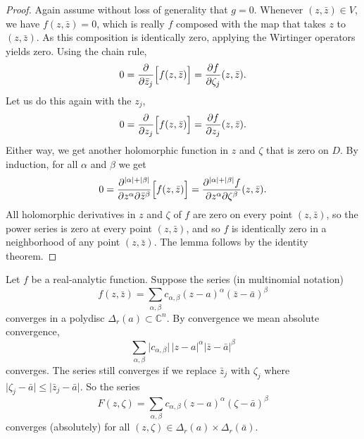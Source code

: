 \documentclass[12pt,openany]{book}
\newcommand{\sabs}[1]{\lvert {#1} \rvert}
\newcommand{\C}{{\mathbb{C}}}
\theoremstyle{plain}
\theoremstyle{remark}
\theoremstyle{definition}
\theoremstyle{exercise}
\theoremstyle{example}
\begin{document}
\begin{proof}
Again assume without loss of generality that $g=0$.
Whenever $(z,\bar{z}) \in V$, we have $f(z,\bar{z}) = 0$, which is really
$f$ composed with the map that takes $z$ to $(z,\bar{z})$.  As this
composition is identically zero, applying the Wirtinger operators yields zero.
Using the chain rule,
\begin{equation*}
0 =
\frac{\partial}{\partial \bar{z}_j} \Bigl[f(z,\bar{z})\Bigr]
=
\frac{\partial f}{\partial \zeta_j}(z,\bar{z}) .
\end{equation*}
Let us do this again with the $z_j$,
\begin{equation*}
0 =
\frac{\partial}{\partial z_j} \Bigl[f(z,\bar{z})\Bigr]
=
\frac{\partial f}{\partial z_j}(z,\bar{z}) .
\end{equation*}
Either way, we get another holomorphic function in $z$ and $\zeta$
that is zero on $D$.
By induction, for all $\alpha$ and $\beta$ we get
\begin{equation*}
0 =
\frac{\partial^{\sabs{\alpha}+\sabs{\beta}}}{\partial z^\alpha \partial \bar{z}^\beta} \Bigl[f(z,\bar{z})\Bigr]
=
\frac{\partial^{\sabs{\alpha}+\sabs{\beta}} f}{\partial z^\alpha \partial
\zeta^\beta}(z,\bar{z}) .
\end{equation*}
All holomorphic derivatives in $z$ and $\zeta$ of $f$ are zero on every point
$(z,\bar{z})$, so the power series is zero at every point $(z,\bar{z})$,
and so $f$ is identically zero in a neighborhood of any
point $(z,\bar{z})$.  The lemma follows by the identity
theorem.
\end{proof}

Let $f$ be a real-analytic function.  Suppose 
the series (in multinomial notation)
\begin{equation*}
f(z,\bar{z}) =
\sum_{\alpha,\beta} c_{\alpha,\beta} {(z-a)}^\alpha
{(\bar{z}-\bar{a})}^\beta
\end{equation*}
converges in a polydisc $\Delta_r(a) \subset \C^n$.
By convergence we mean absolute
convergence,
\begin{equation*}
\sum_{\alpha,\beta} \sabs{c_{\alpha,\beta}} \, \sabs{z-a}^\alpha
\sabs{\bar{z}-\bar{a}}^\beta
\end{equation*}
converges.
The series still converges if we replace $\bar{z}_j$  with
$\zeta_j$ where $\sabs{\zeta_j-\bar{a}} \leq \sabs{\bar{z}_j-\bar{a}}$.
So the series
\begin{equation*}
F(z,\zeta) =
\sum_{\alpha,\beta} c_{\alpha,\beta} {(z-a)}^\alpha
{(\zeta-\bar{a})}^\beta
\end{equation*}
converges (absolutely) for all $(z,\zeta) \in \Delta_r(a) \times \Delta_r(\bar{a})$.
\end{document}
